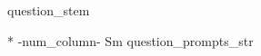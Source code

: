 \begin{question}
    {{ question_stem }}

    \begin{tabular}{ *{ {{-num_column-}} }{S{m{\tabcolsep\relax}}} }
        {{ question_prompts_str }}
    \end{tabular}
\end{question}